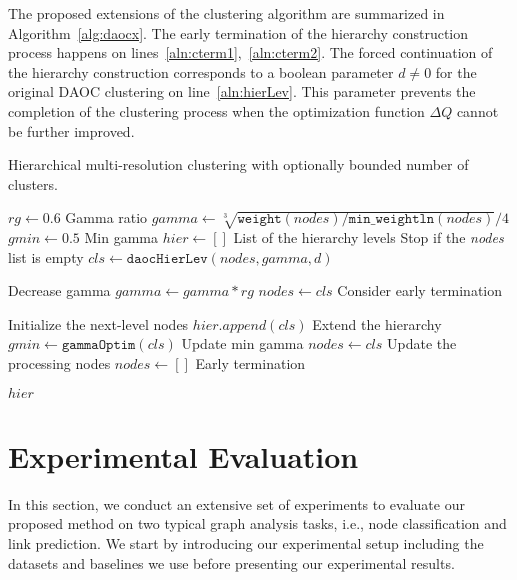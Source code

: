 \documentclass[conference]{IEEEtran}
\begin{document}
The proposed extensions of the clustering algorithm are
summarized in Algorithm~\ref{alg:daocx}. The early termination of the hierarchy construction process happens on lines~\ref{aln:cterm1},~\ref{aln:cterm2}. The forced continuation of the hierarchy construction corresponds to a boolean parameter $d \ne 0$ for the original DAOC clustering on line~\ref{aln:hierLev}. This parameter prevents the completion of the clustering process when the optimization function $\Delta Q$ cannot be further improved.
\begin{algorithm}[H]\small \caption{Hierarchical multi-resolution clustering with optionally bounded number of clusters.}
\label{alg:daocx}
\begin{algorithmic}[1]  
	\State $rg \gets 0.6$  \Comment Gamma ratio
	\State $gamma \gets \sqrt[3]{\texttt{weight}(nodes)/\texttt{min\_weightln}(nodes)}/4$  \State $gmin \gets 0.5$  \Comment Min gamma
	\State $hier \gets []$  \Comment List of the hierarchy levels  \Comment Stop if the \textit{nodes} list is empty
		\State $cls \gets \texttt{daocHierLev}(nodes, gamma, d)$ \label{aln:hierLev}  

  \Comment Decrease gamma  \State $gamma \gets gamma * rg$
		\Else
			\State $nodes \gets cls$ \label{aln:cterm1}  \Comment Consider early termination 
		\EndIf

		  \Comment Initialize the next-level nodes  \State $hier.append(cls)$  \Comment Extend the hierarchy  \State $gmin \gets \texttt{gammaOptim}(cls)$  \Comment Update min gamma
				\State $nodes \gets cls$  \Comment Update the processing nodes \Else
				\State $nodes \gets []$ \label{aln:cterm2}  \Comment Early termination
			\EndIf
		\EndIf

	\EndWhile
	\State \Return $hier$  
\EndFunction
\end{algorithmic}
\end{algorithm}





\section{Experimental Evaluation}  \label{sec:evals}

In this section, we conduct an extensive set of experiments to evaluate our proposed method on two typical graph analysis tasks, i.e., node classification and link prediction. We start by introducing our experimental setup including the datasets and baselines we use before presenting our experimental results.
\end{document}
